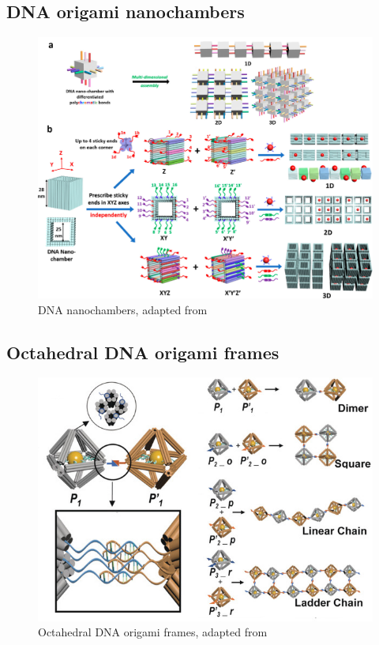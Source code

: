 \cite{sigl2021programmable}


\subsection{DNA origami nanochambers}

\begin{figure}[h]
  \centering\includegraphics[width=\textwidth]{figures/nanochambers2.jpeg}
  \caption{DNA nanochambers, adapted from \cite{nano-chambers_lin2020}}
\end{figure}

\subsection{Octahedral DNA origami frames}

\begin{figure}[h]
  \centering\includegraphics[width=\textwidth]{figures/tian.jpg}
  \caption{Octahedral DNA origami frames, adapted from \cite{tian_octahedra2020}}
\end{figure}




